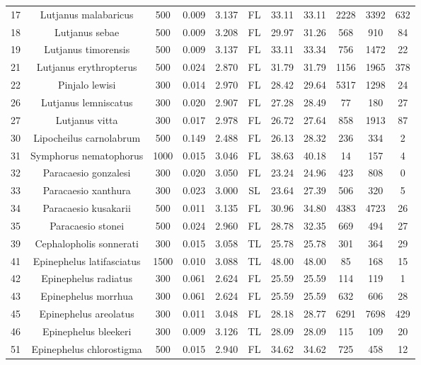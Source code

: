 \documentclass{report}\usepackage[]{graphicx}\usepackage[]{color}
\begin{document}
\begin{table}[ht]
{\begin{tabular}{ccccccccccc}
  17 & Lutjanus malabaricus & 500 & 0.009 & 3.137 & FL & 33.11 & 33.11 & 2228 & 3392 & 632 \\ 
  18 & Lutjanus sebae & 500 & 0.009 & 3.208 & FL & 29.97 & 31.26 & 568 & 910 & 84 \\ 
  19 & Lutjanus timorensis & 500 & 0.009 & 3.137 & FL & 33.11 & 33.34 & 756 & 1472 & 22 \\ 
  21 & Lutjanus erythropterus & 500 & 0.024 & 2.870 & FL & 31.79 & 31.79 & 1156 & 1965 & 378 \\ 
  22 & Pinjalo lewisi & 300 & 0.014 & 2.970 & FL & 28.42 & 29.64 & 5317 & 1298 & 24 \\ 
  26 & Lutjanus lemniscatus & 300 & 0.020 & 2.907 & FL & 27.28 & 28.49 & 77 & 180 & 27 \\ 
  27 & Lutjanus vitta & 300 & 0.017 & 2.978 & FL & 26.72 & 27.64 & 858 & 1913 & 87 \\ 
  30 & Lipocheilus carnolabrum & 500 & 0.149 & 2.488 & FL & 26.13 & 28.32 & 236 & 334 & 2 \\ 
  31 & Symphorus nematophorus & 1000 & 0.015 & 3.046 & FL & 38.63 & 40.18 & 14 & 157 & 4 \\ 
  32 & Paracaesio gonzalesi & 300 & 0.020 & 3.050 & FL & 23.24 & 24.96 & 423 & 808 & 0 \\ 
  33 & Paracaesio xanthura & 300 & 0.023 & 3.000 & SL & 23.64 & 27.39 & 506 & 320 & 5 \\ 
  34 & Paracaesio kusakarii & 500 & 0.011 & 3.135 & FL & 30.96 & 34.80 & 4383 & 4723 & 26 \\ 
  35 & Paracaesio stonei & 500 & 0.024 & 2.960 & FL & 28.78 & 32.35 & 669 & 494 & 27 \\ 
  39 & Cephalopholis sonnerati & 300 & 0.015 & 3.058 & TL & 25.78 & 25.78 & 301 & 364 & 29 \\ 
  41 & Epinephelus latifasciatus & 1500 & 0.010 & 3.088 & TL & 48.00 & 48.00 & 85 & 168 & 15 \\ 
  42 & Epinephelus radiatus & 300 & 0.061 & 2.624 & FL & 25.59 & 25.59 & 114 & 119 & 1 \\ 
  43 & Epinephelus morrhua & 300 & 0.061 & 2.624 & FL & 25.59 & 25.59 & 632 & 606 & 28 \\ 
  45 & Epinephelus areolatus & 300 & 0.011 & 3.048 & FL & 28.18 & 28.77 & 6291 & 7698 & 429 \\ 
  46 & Epinephelus bleekeri & 300 & 0.009 & 3.126 & TL & 28.09 & 28.09 & 115 & 109 & 20 \\ 
  51 & Epinephelus chlorostigma & 500 & 0.015 & 2.940 & FL & 34.62 & 34.62 & 725 & 458 & 12 \\ 

\end{tabular}}
\end{table}
\end{document}
